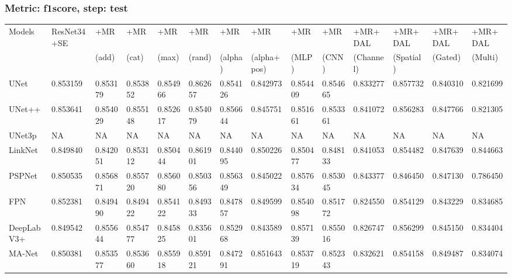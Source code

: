\documentclass{article}
\begin{document}
\subsubsection{Metric: f1score, step: test}
\begin{tabular}{llllllllllllll}
\toprule
Models & ResNet34+SE & +MR  & +MR  & +MR  & +MR  & +MR  & +MR  & +MR  & +MR  & +MR+DAL & +MR+DAL & +MR+DAL & +MR+DAL \\
       &             &  (add) &  (cat) &  (max) &  (rand) &  (alpha) &  (alpha+pos) &  (MLP) &  (CNN) & (Channel) & (Spatial) & (Gated) & (Multi) \\
\midrule
UNet & 0.853159 & 0.853179 & 0.853852 & 0.854966 & 0.862657 & 0.854126 & 0.842973 & 0.854409 & 0.854665 & 0.833277 & 0.857732 & 0.840310 & 0.821699 \\
UNet++ & 0.853641 & 0.854029 & 0.855148 & 0.852617 & 0.854079 & 0.856644 & 0.845751 & 0.851661 & 0.853361 & 0.841072 & 0.856283 & 0.847766 & 0.821305 \\
UNet3p & NA & NA & NA & NA & NA & NA & NA & NA & NA & NA & NA & NA & NA \\
LinkNet & 0.849840 & 0.842051 & 0.853112 & 0.850444 & 0.861901 & 0.844095 & 0.850226 & 0.850477 & 0.848133 & 0.841053 & 0.854482 & 0.847639 & 0.844663 \\
PSPNet & 0.850535 & 0.856871 & 0.855720 & 0.856080 & 0.850356 & 0.856349 & 0.845022 & 0.857634 & 0.853045 & 0.843377 & 0.846450 & 0.847130 & 0.786450 \\
FPN & 0.852381 & 0.849490 & 0.849422 & 0.854122 & 0.849333 & 0.847857 & 0.849599 & 0.854098 & 0.851772 & 0.824550 & 0.854129 & 0.843229 & 0.834685 \\
DeepLabV3+ & 0.849542 & 0.855644 & 0.854777 & 0.845825 & 0.835601 & 0.852968 & 0.843589 & 0.857139 & 0.855016 & 0.826747 & 0.856299 & 0.845150 & 0.834404 \\
MA-Net & 0.850381 & 0.853577 & 0.853660 & 0.855918 & 0.859121 & 0.847291 & 0.851643 & 0.853719 & 0.852343 & 0.832621 & 0.854158 & 0.849487 & 0.834074 \\
\bottomrule
\end{tabular}
\end{document}
